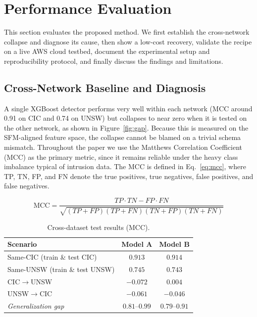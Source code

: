 \documentclass[11pt,a4paper]{article}
\begin{document}
\section{Performance Evaluation}
This section evaluates the proposed method. We first establish the cross-network
collapse and diagnose its cause, then show a low-cost recovery, validate the recipe on
a live AWS cloud testbed, document the experimental setup and reproducibility protocol,
and finally discuss the findings and limitations.

\subsection{Cross-Network Baseline and Diagnosis}
A single XGBoost detector performs very well within each network (MCC around 0.91 on CIC
and 0.74 on UNSW) but collapses to near zero when it is tested on the other network, as
shown in Figure~\ref{fig:gap}. Because this is measured on the SFM-aligned feature space,
the collapse cannot be blamed on a trivial schema mismatch. Throughout the paper we use
the Matthews Correlation Coefficient (MCC) as the primary metric, since it remains
reliable under the heavy class imbalance typical of intrusion data. The MCC is defined in
Eq.~\eqref{eq:mcc}, where TP, TN, FP, and FN denote the true positives, true negatives,
false positives, and false negatives.

\begin{equation}
  \mathrm{MCC} = \frac{TP\cdot TN - FP\cdot FN}
  {\sqrt{(TP{+}FP)(TP{+}FN)(TN{+}FP)(TN{+}FN)}}
  \label{eq:mcc}
\end{equation}

\begin{table}[htbp]
\centering
\caption{Cross-dataset test results (MCC).}
\label{tab:baseline}
\footnotesize
\begin{tabular}{lcc}
\toprule
Scenario & Model A & Model B \\
\midrule
Same-CIC (train \& test CIC)   & $0.913$ & $0.914$ \\
Same-UNSW (train \& test UNSW) & $0.745$ & $0.743$ \\
CIC$\rightarrow$UNSW           & $-0.072$ & $0.004$ \\
UNSW$\rightarrow$CIC           & $-0.061$ & $-0.046$ \\
\midrule
\emph{Generalization gap}      & $0.81$--$0.99$ & $0.79$--$0.91$ \\
\bottomrule
\end{tabular}
\end{table}
\end{document}
